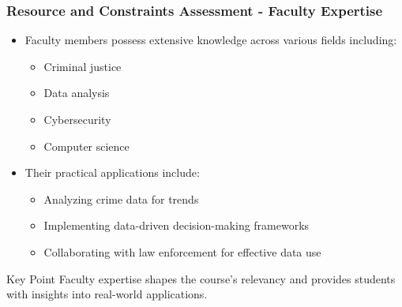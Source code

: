 \documentclass[aspectratio=169]{beamer}
\begin{document}
\begin{frame}[fragile]
    \frametitle{Resource and Constraints Assessment - Faculty Expertise}
    \begin{itemize}
        \item Faculty members possess extensive knowledge across various fields including:
        \begin{itemize}
            \item Criminal justice
            \item Data analysis
            \item Cybersecurity
            \item Computer science
        \end{itemize}
        \item Their practical applications include:
        \begin{itemize}
            \item Analyzing crime data for trends
            \item Implementing data-driven decision-making frameworks
            \item Collaborating with law enforcement for effective data use
        \end{itemize}
    \end{itemize}
    \begin{block}{Key Point}
        Faculty expertise shapes the course's relevancy and provides students with insights into real-world applications.
    \end{block}
\end{frame}
\end{document}
